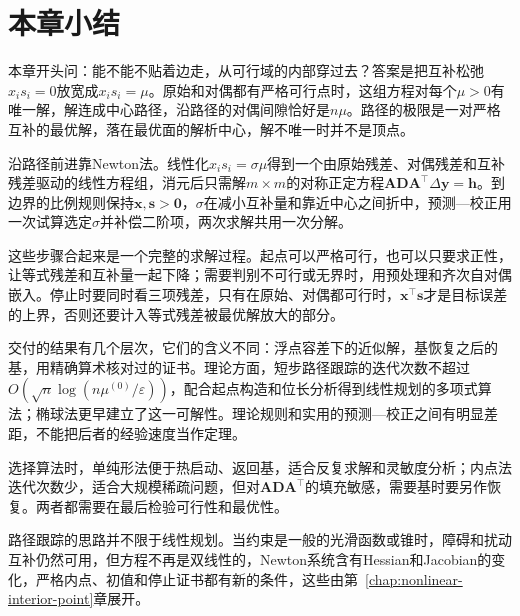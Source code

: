 \section{本章小结}
\label{sec:lpipm-summary}

本章开头问：能不能不贴着边走，从可行域的内部穿过去？答案是把互补松弛$x_is_i=0$放宽成$x_is_i=\mu$。原始和对偶都有严格可行点时，这组方程对每个$\mu>0$有唯一解，解连成中心路径，沿路径的对偶间隙恰好是$n\mu$。路径的极限是一对严格互补的最优解，落在最优面的解析中心，解不唯一时并不是顶点。

沿路径前进靠Newton法。线性化$x_is_i=\sigma\mu$得到一个由原始残差、对偶残差和互补残差驱动的线性方程组，消元后只需解$m\times m$的对称正定方程$\bm{A}\bm{D}\bm{A}^\top\Delta\bm{y}=\bm{h}$。到边界的比例规则保持$\bm{x},\bm{s}>\bm{0}$，$\sigma$在减小互补量和靠近中心之间折中，预测—校正用一次试算选定$\sigma$并补偿二阶项，两次求解共用一次分解。

这些步骤合起来是一个完整的求解过程。起点可以严格可行，也可以只要求正性，让等式残差和互补量一起下降；需要判别不可行或无界时，用预处理和齐次自对偶嵌入。停止时要同时看三项残差，只有在原始、对偶都可行时，$\bm{x}^\top\bm{s}$才是目标误差的上界，否则还要计入等式残差被最优解放大的部分。

交付的结果有几个层次，它们的含义不同：浮点容差下的近似解，基恢复之后的基，用精确算术核对过的证书。理论方面，短步路径跟踪的迭代次数不超过$O(\sqrt{n}\log(n\mu^{(0)}/\varepsilon))$，配合起点构造和位长分析得到线性规划的多项式算法；椭球法更早建立了这一可解性。理论规则和实用的预测—校正之间有明显差距，不能把后者的经验速度当作定理。

选择算法时，单纯形法便于热启动、返回基，适合反复求解和灵敏度分析；内点法迭代次数少，适合大规模稀疏问题，但对$\bm{A}\bm{D}\bm{A}^\top$的填充敏感，需要基时要另作恢复。两者都需要在最后检验可行性和最优性。

路径跟踪的思路并不限于线性规划。当约束是一般的光滑函数或锥时，障碍和扰动互补仍然可用，但方程不再是双线性的，Newton系统含有Hessian和Jacobian的变化，严格内点、初值和停止证书都有新的条件，这些由第~\ref{chap:nonlinear-interior-point}章展开。
